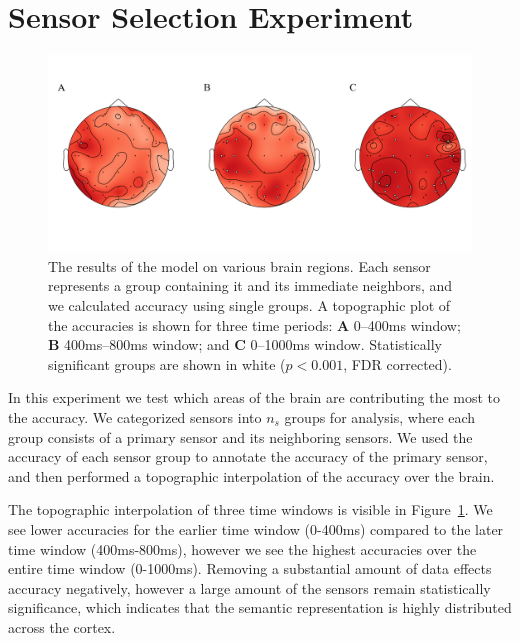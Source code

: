 \section{Sensor Selection Experiment}

\begin{figure}[t]
  \centering
  \includegraphics[width=0.9\linewidth]{figures/topographic}
  \caption[Topographic Analysis of \tvt Accuracy]{
    The results of the model on various brain regions. Each sensor represents a 
    group containing it and its immediate neighbors, and we calculated \tvt 
    accuracy using single groups.  A topographic plot of the \tvt accuracies is 
    shown for three time periods: {\bf A}  0--400ms window; {\bf B} 
    400ms--800ms window; and {\bf C} 0--1000ms window. Statistically 
    significant groups are shown in white ($p < 0.001$, FDR corrected).
  }
  \label{fig:topographic}
\end{figure}


In this experiment we test which areas of the brain are contributing the most 
to the \tvt accuracy. We categorized sensors into $n_s$ groups for analysis, 
where each group consists of a primary sensor and its neighboring sensors. We 
used the accuracy of each sensor group to annotate the accuracy of the primary 
sensor, and then performed a topographic interpolation of the \tvt accuracy 
over the brain. 

The topographic interpolation of three time windows is visible in 
Figure~\ref{fig:topographic}. We see lower \tvt accuracies for the earlier time 
window (0-400ms) compared to the later time window (400ms-800ms), however we 
see the highest accuracies over the entire time window (0-1000ms). Removing a 
substantial amount of data effects accuracy negatively, however a large amount 
of the sensors remain statistically significance, which indicates that the 
semantic representation is highly distributed across the cortex.
